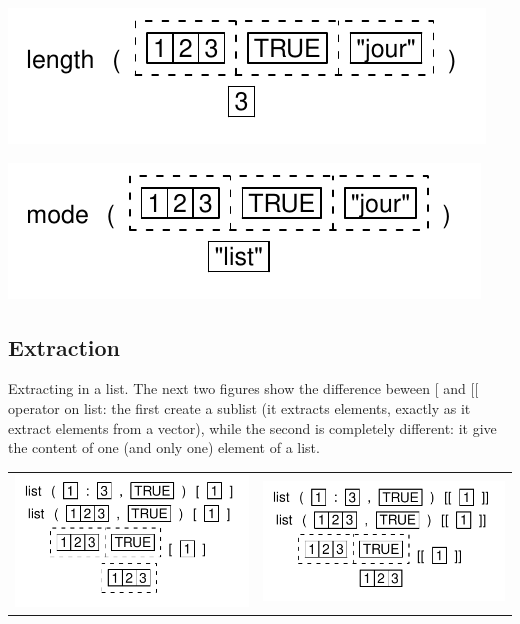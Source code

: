 \documentclass[pdflatex]{article}
\begin{document}
\includegraphics{list_length}

\includegraphics{list_mode}

\subsection{Extraction}

Extracting in a list. The next two figures show the difference beween [ and [[ operator on list: the first create a sublist (it extracts elements, exactly as it extract elements from a vector), while the second is completely different: it give the content of one (and only one) element of a list.

\begin{tabular}{cc}
\includegraphics{list_extract_simple.pdf} & \includegraphics{list_extract_double.pdf}
\end{tabular}
\end{document}
